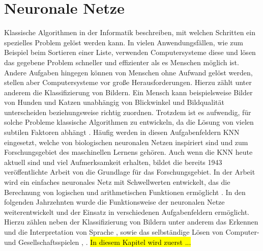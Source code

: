 \section{Neuronale Netze}
\label{sec:neuroal_networks}
Klassische Algorithmen in der Informatik beschreiben, mit welchen Schritten ein spezielles Problem gelöst werden kann. In vielen Anwendungsfällen, wie zum Beispiel beim Sortieren einer Liste, verwenden Computersysteme diese und lösen das gegebene Problem schneller und effizienter als es Menschen möglich ist. Andere Aufgaben hingegen können von Menschen ohne Aufwand gelöst werden, stellen aber Computersysteme vor große Herausforderungen. Hierzu zählt unter anderem die Klassifizierung von Bildern. Ein Mensch kann beispielsweise Bilder von Hunden und Katzen unabhängig von Blickwinkel und Bildqualität unterscheiden beziehungsweise richtig zuordnen. Trotzdem ist es aufwendig, für solche Probleme klassische Algorithmen zu entwickeln, da die Lösung von vielen subtilen Faktoren abhängt \cite{kriesel2008kleiner}. Häufig werden in diesen Aufgabenfeldern \ac{KNN} eingesetzt, welche von biologischen neuronalen Netzen inspiriert sind und zum Forschungsgebiet des maschinellen Lernens gehören. Auch wenn die \ac{KNN} heute aktuell sind und viel Aufmerksamkeit erhalten, bildet die bereits 1943 veröffentlichte Arbeit von \citeauthor{mcculloch1943logical} die Grundlage für das Forschungsgebiet. In der Arbeit wird ein einfaches neuronales Netz mit Schwellwerten entwickelt, das die Berechnung von logischen und arithmetischen Funktionen ermöglicht \cite{mcculloch1943logical}. In den folgenden Jahrzehnten wurde die Funktionsweise der neuronalen Netze weiterentwickelt und der Einsatz in verschiedenen Aufgabenfeldern ermöglicht. Hierzu zählen neben der Klassifizierung von Bildern \cite{krizhevsky2012imagenet} unter anderem das Erkennen und die Interpretation von Sprache \cite{hinton2012deep}, \cite{andor2016globally} sowie das selbständige Lösen von Computer- und Gesellschaftsspielen \cite{mnih2013playing}, \cite{silver2016mastering}. 
\hl{In diesem Kapitel wird zuerst ...}%
